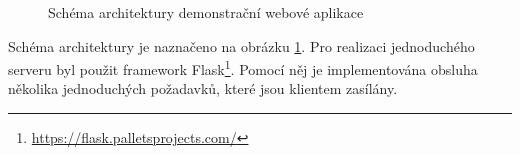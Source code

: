 \begin{figure}[hbt]
	\centering
	\caption{Schéma architektury demonstrační webové aplikace}
	\label{web_demo_schema}
\end{figure}

Schéma architektury je naznačeno na obrázku \ref{web_demo_schema}. Pro realizaci jednoduchého serveru byl použit framework Flask\footnote{\url{https://flask.palletsprojects.com/}}. Pomocí něj je implementována obsluha několika jednoduchých požadavků, které jsou klientem zasílány.\par

